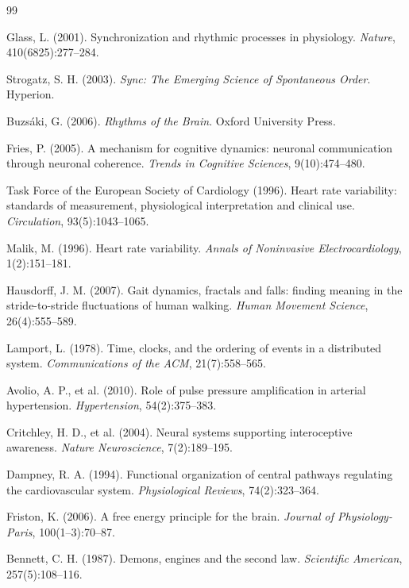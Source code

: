 \documentclass[12pt]{article}
\theoremstyle{remark}
\begin{document}

\begin{thebibliography}{99}

Glass, L. (2001). Synchronization and rhythmic processes in physiology. \textit{Nature}, 410(6825):277--284.

Strogatz, S. H. (2003). \textit{Sync: The Emerging Science of Spontaneous Order}. Hyperion.

Buzsáki, G. (2006). \textit{Rhythms of the Brain}. Oxford University Press.

Fries, P. (2005). A mechanism for cognitive dynamics: neuronal communication through neuronal coherence. \textit{Trends in Cognitive Sciences}, 9(10):474--480.

Task Force of the European Society of Cardiology (1996). Heart rate variability: standards of measurement, physiological interpretation and clinical use. \textit{Circulation}, 93(5):1043--1065.

Malik, M. (1996). Heart rate variability. \textit{Annals of Noninvasive Electrocardiology}, 1(2):151--181.

Hausdorff, J. M. (2007). Gait dynamics, fractals and falls: finding meaning in the stride-to-stride fluctuations of human walking. \textit{Human Movement Science}, 26(4):555--589.

Lamport, L. (1978). Time, clocks, and the ordering of events in a distributed system. \textit{Communications of the ACM}, 21(7):558--565.

Avolio, A. P., et al. (2010). Role of pulse pressure amplification in arterial hypertension. \textit{Hypertension}, 54(2):375--383.

Critchley, H. D., et al. (2004). Neural systems supporting interoceptive awareness. \textit{Nature Neuroscience}, 7(2):189--195.

Dampney, R. A. (1994). Functional organization of central pathways regulating the cardiovascular system. \textit{Physiological Reviews}, 74(2):323--364.

Friston, K. (2006). A free energy principle for the brain. \textit{Journal of Physiology-Paris}, 100(1--3):70--87.

Bennett, C. H. (1987). Demons, engines and the second law. \textit{Scientific American}, 257(5):108--116.


\end{thebibliography}
\end{document}
